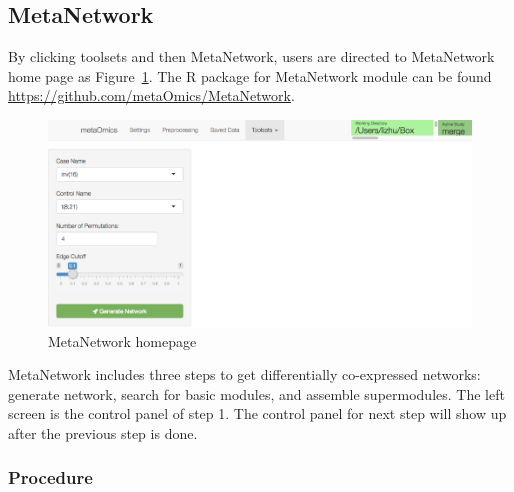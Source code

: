 \subsection{MetaNetwork}
By clicking toolsets and then MetaNetwork,
users are directed to MetaNetwork home page as Figure~\ref{fig:MetaNetworkHome}.
The R package for MetaNetwork module can be found \url{https://github.com/metaOmics/MetaNetwork}.

\begin{figure}[H]
\begin{center}
\includegraphics[scale=0.9]{./figure/MetaNetwork/MetaNetworkHome}
\caption{MetaNetwork homepage}
\label{fig:MetaNetworkHome}
\end{center}
\end{figure}

MetaNetwork includes three steps to get differentially co-expressed networks: generate network, search for basic modules, and assemble supermodules. The left screen is the control panel of step 1. The control panel for next step will show up after the previous step is done.

\subsubsection{Procedure}

